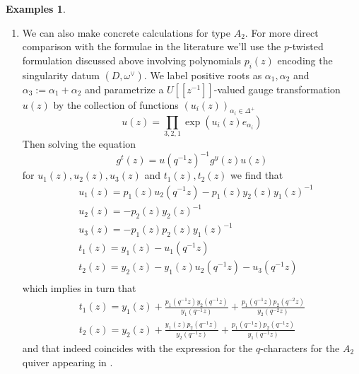 \documentclass[11pt, oneside, reqno]{amsart}
\theoremstyle{definition} \newtheorem{definition}{Definition}[section]
\theoremstyle{definition} \newtheorem{remark}[definition]{Remark}
\theoremstyle{definition} \newtheorem{remarks}[definition]{Remarks}
\theoremstyle{definition} \newtheorem{question}[definition]{Question}
\theoremstyle{definition} \newtheorem*{note}{Note}
\theoremstyle{definition} \newtheorem{example}[definition]{Example}
\theoremstyle{definition} \newtheorem{examples}[definition]{Examples}
\begin{document}
\begin{examples}
\begin{enumerate}
 \item We can also make concrete calculations for type $A_2$.  For more direct comparison with the formulae in the literature we'll use the $p$-twisted formulation discussed above involving polynomials $p_i(z)$ encoding the singularity datum $(D, \omega^\vee)$.  We label positive roots as $\alpha_1, \alpha_2$ and $\alpha_3:=\alpha_1 + \alpha_2$ and parametrize a $U[[z^{-1}]]$-valued
  gauge transformation $u(z)$ by the collection of functions  
 $(u_{i}(z))_{\alpha_i  \in \Delta^{+}}$ 
  \begin{equation*}
    u(z) = \prod_{3,2,1} \exp( u_{i}(z) e_{\alpha_i})
  \end{equation*}
Then solving the equation 
\begin{equation*}
g^t(z) =  u(q^{-1} z)^{-1} g^y(z) u(z)
\end{equation*}
for $u_{1}(z), u_{2}(z), u_{3}(z)$ and $t_{1}(z), t_{2}(z)$  we find that
\begin{equation*}
\begin{aligned}
& u_{1}(z) = p_{1}(z) u_{2}(q^{-1} z)-p_{1}(z) y_{2}(z) y_{1}(z)^{-1} \\
& u_{2}(z) =  -p_{2}(z) y_{2}(z)^{-1} \\
& u_{3}(z) = -p_{1}(z) p_{2}(z) y_{1}(z)^{-1} \\
& t_{1}(z) = y_{1}(z)-u_{1}(q^{-1}z) \\
& t_{2}(z) = y_{2}(z) - y_{1}(z) u_{2}(q^{-1}z)-u_{3}(q^{-1}z) \\
\end{aligned}
\end{equation*}
which implies in turn that
\begin{equation*}
  \begin{aligned}
    t_{1}(z) =y_{1}(z)  +  \frac{p_{1}(q^{-1}z) y_{2}(q^{-1}z)}{y_{1}(q^{-1}z)} + \frac{p_{1}(q^{-1}z) p_{2}(q^{-2} z)}{ y_{2}(q^{-2} z)}\\
    t_{2}(z) = y_{2}(z)  +\frac{y_{1}(z) p_{2}(q^{-1}z)}{y_{2}(q^{-1}z)}+   \frac{p_{1}(q^{-1}z) p_{2}(q^{-1}z)}{y_{1}(q^{-1}z)}
  \end{aligned}
\end{equation*}
and that indeed coincides with the expression for the $q$-characters for the $A_2$ quiver appearing in
\cite{Nekrasov:2015wsu,NekrasovPestunShatashvili,NekrasovPestun,Kimura:2015rgi}.
\end{enumerate}
\end{examples}
\end{document}
